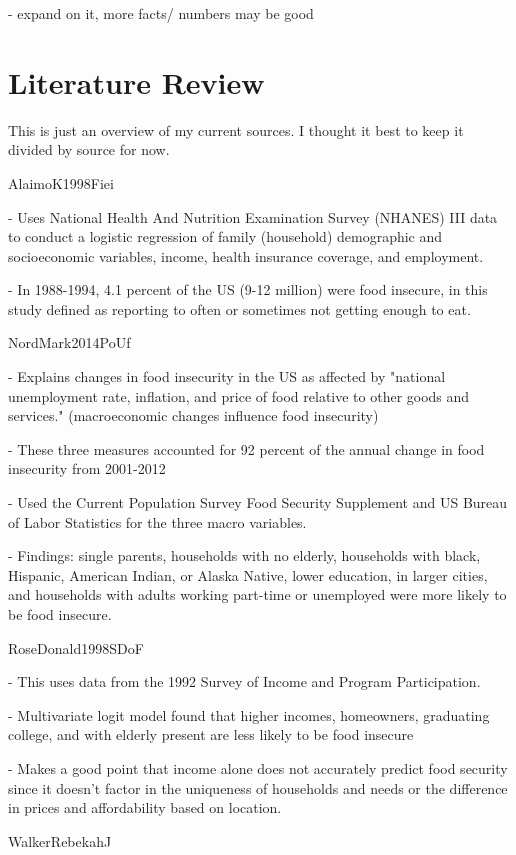 \documentclass[12pt,english]{article}
\begin{document}
- expand on it, more facts/ numbers may be good 

\section{Literature Review}\label{sec:litreview}
This is just an overview of my current sources. I thought it best to keep it divided by source for now.

\citet{AlaimoK1998Fiei}
AlaimoK1998Fiei

- Uses National Health And Nutrition Examination Survey (NHANES) III data to conduct a logistic regression of family (household) demographic and socioeconomic variables, income, health insurance coverage, and employment.

- In 1988-1994, 4.1 percent of the US (9-12 million) were food insecure, in this study defined as reporting to often or sometimes not getting enough to eat. 


\citet{NordMark2014PoUf}
NordMark2014PoUf

- Explains changes in food insecurity in the US as affected by "national unemployment rate, inflation, and price of food relative to other goods and services." (macroeconomic changes influence food insecurity)

- These three measures accounted for 92 percent of the annual change in food insecurity from 2001-2012

- Used the Current Population Survey Food Security Supplement and US Bureau of Labor Statistics for the three macro variables. 

- Findings: single parents, households with no elderly, households with black, Hispanic, American Indian, or Alaska Native, lower education, in larger cities, and households with adults working part-time or unemployed were more likely to be food insecure. 

\citet{RoseDonald1998SDoF}
RoseDonald1998SDoF

- This uses data from the 1992 Survey of Income and Program Participation. 

- Multivariate logit model found that higher incomes, homeowners, graduating college, and with elderly present are less likely to be food insecure

- Makes a good point that income alone does not accurately predict food security since it doesn't factor in the uniqueness of households and needs or the difference in prices and affordability based on location.

\citet{WalkerRebekahJ}
WalkerRebekahJ
\end{document}
